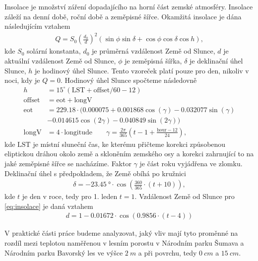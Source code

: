 Insolace je množství záření dopadajícího na horní část zemské atmosféry. Insolace záleží na denní době, roční době a zeměpisné šířce. Okamžitá insolace je dána následujícím vztahem\cite{insolace}
\begin{gather}\label{eq:insolace}
Q = S_0\left(\frac{d_0}{d}\right)^2\left(\sin\phi\sin\delta + \cos\phi\cos\delta\cos h\right),
\end{gather}
kde $S_0$ solární konstanta, $d_0$ je průměrná vzdálenost Země od Slunce, $d$ je aktuální vzdálenost Země od Slunce, $\phi$ je zeměpisná šířka, $\delta$ je deklinační úhel Slunce, $h$ je hodinový úhel Slunce. Tento vzoreček platí pouze pro den, nikoliv v noci, kdy je $Q=0$. Hodinový úhel Slunce spočteme následovně\cite{hourangle}
\begin{equation}
	\begin{split}
		h &= 15^{\circ}\left(\text{LST}+\text{offset}/60-12\right)\\
		\text{offset} &= \text{eot} + \text{longV}\\
		\text{eot} &= 229.18\cdot(0.000075+0.001868\cos(\gamma)-0.032077\sin(\gamma)\\
		& -0.014615\cos(2\gamma)-0.040849\sin(2\gamma))\\
		\text{longV} &= 4\cdot\text{longitude}\qquad \gamma = \frac{2\pi}{365}\left(t - 1 + \frac{\text{hour}-12}{24}\right),
	\end{split}
\end{equation}
kde $\text{LST}$ je místní sluneční čas, ke kterému přičteme korekci způsobenou eliptickou dráhou okolo země a skloněním zemského osy a korekci zahrnující to na jaké zeměpisné šířce se nacházíme. Faktor $\gamma$ je část roku vyjádřena ve zlomku.
Deklinační úhel s předpokladem, že Země obíhá po kružnici\cite{declinationangle}
\begin{gather*}
\delta = \SI{-23.45}{\degree} \cdot \cos\left(\frac{360}{365}\cdot(t+10)\right),
\end{gather*}
kde $t$ je den v roce, tedy pro 1. leden $t=1$. Vzdálenost Země od Slunce pro \eqref{eq:insolace} je daná vztahem\cite{sunearthdist}
\begin{gather*}
d = 1-0.01672\cdot \cos\left(0.9856\cdot(t-4)\right)
\end{gather*}

V praktické části práce budeme analyzovat, jaký vliv mají tyto proměnné na rozdíl mezi teplotou naměřenou v lesním porostu v Národním parku Šumava a Národním parku Bavorský les ve výšce $\SI{2}{m}$ a při povrchu, tedy $\SI{0}{cm}$ a $\SI{15}{cm}$.

